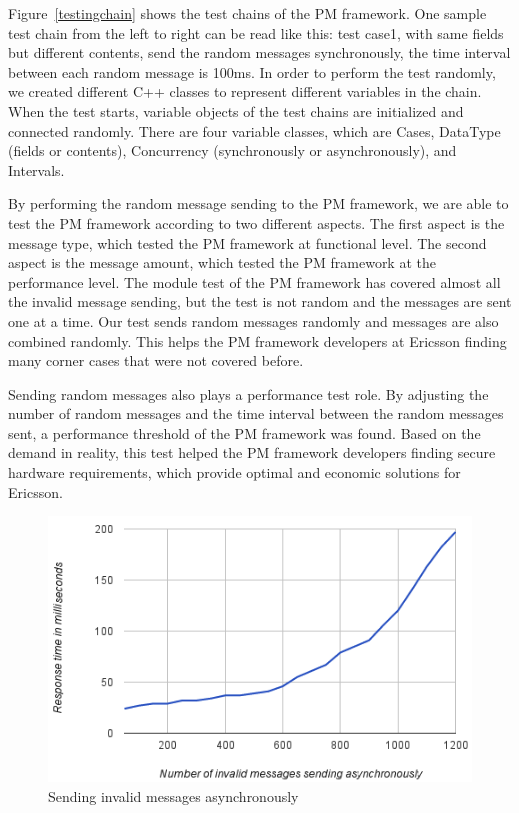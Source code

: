 Figure~\ref{testingchain} shows the test chains of the PM framework. One sample test chain from the left to right can be read like this: test case1, with same fields but different contents, send the random messages synchronously, the time interval between each random message is 100ms. In order to perform the test randomly, we created different C++ classes to represent different variables in the chain. When the test starts, variable objects of the test chains are initialized and connected randomly. There are four variable classes, which are Cases, DataType (fields or contents), Concurrency (synchronously or asynchronously), and Intervals.

By performing the random message sending to the PM framework, we are able to test the PM framework according to two different aspects. The first aspect is the message type, which tested the PM framework at functional level. The second aspect is the message amount, which tested the PM framework at the performance level. The module test of the PM framework has covered almost all the invalid message sending, but the test is not random and the messages are sent one at a time. Our test sends random messages randomly and messages are also combined randomly. This helps the PM framework developers at Ericsson finding many corner cases that were not covered before. %

Sending random messages also plays a performance test role. By adjusting the number of random messages and the time interval between the random messages sent, a performance threshold of the PM framework was found. Based on the demand in reality, this test helped the PM framework developers finding secure hardware requirements, which provide optimal and economic solutions for Ericsson.

\begin{figure}[h!]
\centering
\includegraphics[width=\columnwidth]{figure/asynseding.png}
\caption{Sending invalid messages asynchronously \label{asynseding}}
\end{figure}

